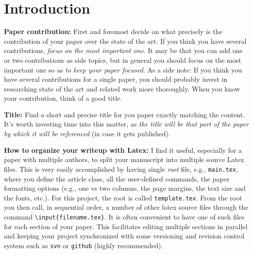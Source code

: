 
\section{Introduction}
\label{sec:introduction}

\begin{remark}
\textbf{Paper contribution:} First and foremost decide on what precisely is the contribution of your paper over the state of the art. If you think you have several contributions, {\it focus on the most important one}. It may be that you can add one or two contributions as side topics, but in general you should focus on the most important one so as {\it to keep your paper focused}. As a side note: If you think you have several contributions for a single paper, you should probably invest in researching state of the art and related work more thoroughly. When you know your contribution, think of a good title.
\end{remark}

\begin{remark} 
\textbf{Title:} Find a short and precise title for you paper exactly matching the content. It's worth investing time into this matter, as {\it the title will be that part of the paper by which it will be referenced} (in case it gets published).
\end{remark}

\begin{remark}
\textbf{How to organize your writeup with Latex:} I find it useful, especially for a paper with multiple authors, to split your manuscript into multiple source Latex files. This is very easily accomplished by having single {\it root} file, e.g., \texttt{main.tex}, where you define the article class, all the \mbox{user-defined} commands, the paper formatting options (e.g., one vs two columns, the page margins, the text size and the fonts, etc.). For this project, the root is called \texttt{template.tex}. From the root you then call, in sequential order, a number of other latex source files through the command \texttt{\textbackslash input\{filename.tex\}}. It is often convenient to have one of such files for each section of your paper. This facilitates editing multiple sections in parallel and keeping your project synchronized with some versioning and revision control system such as \texttt{svn} or \texttt{github} (highly recommended).
\end{remark}

